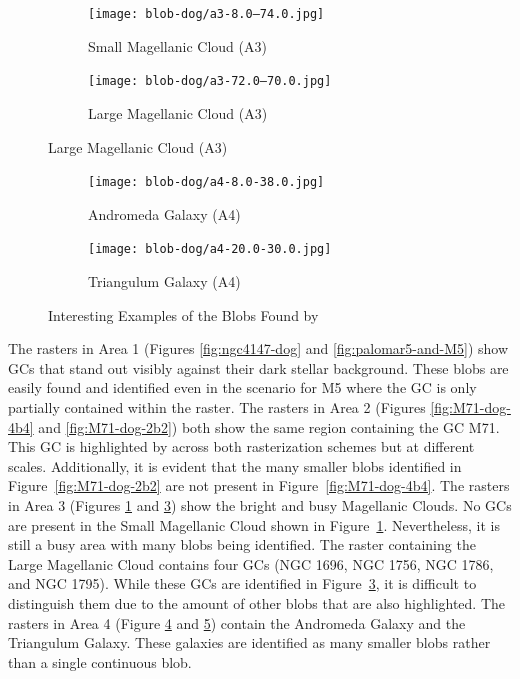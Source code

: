 \begin{figure}[H]\ContinuedFloat{}
    \centering
    \begin{subfigure}[b]{0.33\textwidth}
        \texttt{[image: blob-dog/a3-8.0--74.0.jpg]}
        \caption{\label{fig:small-magellanic-cloud}Small Magellanic Cloud (A3)}
    \end{subfigure}
    \begin{subfigure}[b]{0.33\textwidth}
        \texttt{[image: blob-dog/a3-72.0--70.0.jpg]}
        \caption{\label{fig:large-magellanic-cloud}Large Magellanic Cloud (A3)}
    \end{subfigure}
\end{figure}

\begin{figure}[H]\ContinuedFloat{}
    \centering
    \begin{subfigure}[b]{0.33\textwidth}
        \texttt{[image: blob-dog/a4-8.0-38.0.jpg]}
        \caption{\label{fig:andromeda}Andromeda Galaxy (A4)}
    \end{subfigure}
    \begin{subfigure}[b]{0.33\textwidth}
        \texttt{[image: blob-dog/a4-20.0-30.0.jpg]}
        \caption{\label{fig:triangulum}Triangulum Galaxy (A4)}
    \end{subfigure}

    \caption{\label{fig:dog-examples} Interesting Examples of the Blobs Found by \blobdog{}}
\end{figure}
The rasters in Area 1 (Figures \ref{fig:ngc4147-dog} and
\ref{fig:palomar5-and-M5}) show GCs that stand out visibly against their dark
stellar background. These blobs are easily found and identified even in the
scenario for M5 where the GC is only partially contained within the raster. The
rasters in Area 2 (Figures \ref{fig:M71-dog-4b4} and \ref{fig:M71-dog-2b2}) both
show the same region containing the GC M71. This GC is highlighted by \blobdog{}
across both rasterization schemes but at different scales. Additionally, it is
evident that the many smaller blobs identified in Figure~\ref{fig:M71-dog-2b2}
are not present in Figure~\ref{fig:M71-dog-4b4}. The rasters in Area 3 (Figures
\ref{fig:small-magellanic-cloud} and \ref{fig:large-magellanic-cloud}) show the
bright and busy Magellanic Clouds. No GCs are present in the Small Magellanic
Cloud shown in Figure~\ref{fig:small-magellanic-cloud}. Nevertheless, it is
still a busy area with many blobs being identified. The raster containing the
Large Magellanic Cloud contains four GCs (NGC 1696, NGC 1756, NGC 1786, and NGC
1795). While these GCs are identified in
Figure~\ref{fig:large-magellanic-cloud}, it is difficult to distinguish them due
to the amount of other blobs that are also highlighted. The rasters in Area 4
(Figure \ref{fig:andromeda} and \ref{fig:triangulum}) contain the Andromeda
Galaxy and the Triangulum Galaxy. These galaxies are identified as many smaller
blobs rather than a single continuous blob.

